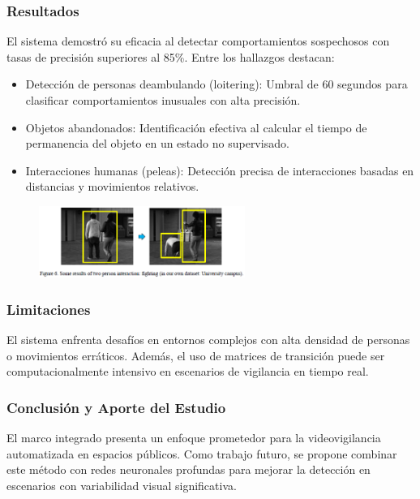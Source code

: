 \subsubsection{Resultados}
El sistema demostró su eficacia al detectar comportamientos sospechosos con tasas de precisión superiores al 85\%. Entre los hallazgos destacan:

\begin{itemize}
    \item Detección de personas deambulando (loitering): Umbral de 60 segundos para clasificar comportamientos inusuales con alta precisión.
    \item Objetos abandonados: Identificación efectiva al calcular el tiempo de permanencia del objeto en un estado no supervisado.
    \item Interacciones humanas (peleas): Detección precisa de interacciones basadas en distancias y movimientos relativos.
\end{itemize}

\begin{figure}[h] %
    \centering
    \includegraphics[width=0.6\textwidth]{4/re8.png} %
    \label{fig:ejemplo} %
\end{figure}

\subsubsection{Limitaciones}
El sistema enfrenta desafíos en entornos complejos con alta densidad de personas o movimientos erráticos. Además, el uso de matrices de transición puede ser computacionalmente intensivo en escenarios de vigilancia en tiempo real.

\subsubsection{Conclusión y Aporte del Estudio}
El marco integrado presenta un enfoque prometedor para la videovigilancia automatizada en espacios públicos. Como trabajo futuro, se propone combinar este método con redes neuronales profundas para mejorar la detección en escenarios con variabilidad visual significativa.